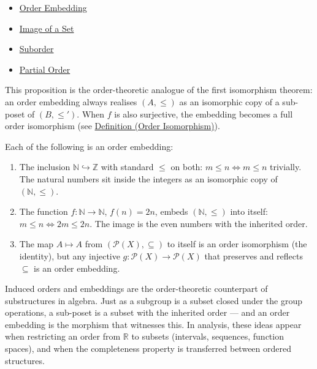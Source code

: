 \begin{dependencies}
\begin{itemize}
  \item \hyperref[def:order-embedding]{Order Embedding}
  \item \hyperref[def:image-set]{Image of a Set}
  \item \hyperref[def:suborder]{Suborder}
  \item \hyperref[def:partial-order]{Partial Order}
\end{itemize}
\end{dependencies}

\begin{remark*}[Consequence]
This proposition is the order-theoretic analogue of the first isomorphism
theorem: an order embedding always realises $(A,\leq)$ as an isomorphic
copy of a sub-poset of $(B,\leq')$. When $f$ is also surjective, the
embedding becomes a full order isomorphism
(see \hyperref[def:order-iso]{Definition (Order Isomorphism)}).
\end{remark*}

\begin{example*}
Each of the following is an order embedding:
\begin{enumerate}[label=(\roman*)]
  \item The inclusion $\mathbb{N} \hookrightarrow \mathbb{Z}$ with standard
        $\leq$ on both: $m \leq n \iff m \leq n$ trivially. The natural
        numbers sit inside the integers as an isomorphic copy of $(\mathbb{N},\leq)$.
  \item The function $f : \mathbb{N} \to \mathbb{N}$, $f(n) = 2n$, embeds
        $(\mathbb{N},\leq)$ into itself: $m \leq n \iff 2m \leq 2n$.
        The image is the even numbers with the inherited order.
  \item The map $A \mapsto A$ from $(\mathcal{P}(X), \subseteq)$ to itself
        is an order isomorphism (the identity), but any injective
        $g : \mathcal{P}(X) \to \mathcal{P}(X)$ that preserves and reflects
        $\subseteq$ is an order embedding.
\end{enumerate}
\end{example*}

\begin{remark*}[Transition]
Induced orders and embeddings are the order-theoretic counterpart of
substructures in algebra. Just as a subgroup is a subset closed under the
group operations, a sub-poset is a subset with the inherited order ---
and an order embedding is the morphism that witnesses this. In analysis,
these ideas appear when restricting an order from $\mathbb{R}$ to subsets
(intervals, sequences, function spaces), and when the completeness property
is transferred between ordered structures.
\end{remark*}
